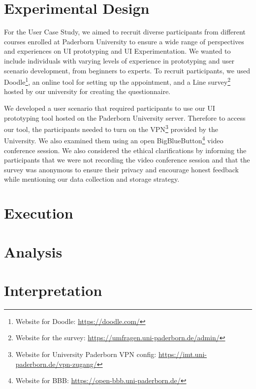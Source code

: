 \section{Experimental Design}
\label{evaluation:section:design}
For the User Case Study, we aimed to recruit diverse participants from different courses enrolled at Paderborn University to ensure a wide range of perspectives and experiences on UI prototyping and UI Experimentation. 
We wanted to include individuals with varying levels of experience in prototyping and user scenario development, from beginners to experts. 
To recruit participants, we used Doodle\footnote{Website for Doodle: \url{https://doodle.com/}}, an online tool for setting up the appointment, and a Line survey\footnote{Website for the survey: \url{https://umfragen.uni-paderborn.de/admin/}} hosted by our university for creating the questionnaire.

We developed a user scenario that required participants to use our UI prototyping tool hosted on the Paderborn University server. 
Therefore to access our tool, the participants needed to turn on the VPN\footnote{Website for University Paderborn VPN config: \url{https://imt.uni-paderborn.de/vpn-zugang/}} provided by the University. 
We also examined them using an open BigBlueButton\footnote{Website for BBB: \url{https://open-bbb.uni-paderborn.de/}} video conference session. 
We also considered the ethical clarifications by informing the participants that we were not recording the video conference session and that the survey was anonymous to ensure their privacy and encourage honest feedback while mentioning our data collection and storage strategy.

\section{Execution}
\label{evaluation:section:execution}
\section{Analysis}
\label{evaluation:section:analysis}
\section{Interpretation}
\label{evaluation:section:interpretation}